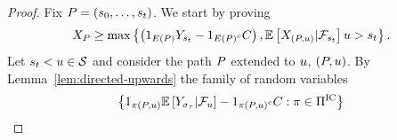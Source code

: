 \begin{proof}
    Fix
    \(
        P
        =
        \left(
            s_{0},
            \ldots,
            s_{t}
        \right)
    \).
    We start by proving
    \begin{align*}
        X_{P}
        \geq
        \max\left\{
            \left(
                1_{
                    E\left(P\right)
                }
                Y_{s_{t}}
                -
                1_{
                    E\left(P\right)^c
                }
                C
            \right),
            \mathbb{E}\left[
                X_{
                    \left(
                        P, u
                    \right)
                }
                |
                \mathcal{F}_{s_{t}}
            \right]
            u
            > s_{t} 
        \right\} .
    \end{align*}  
    Let 
    \(
        s_{t}<u\in\mathcal{S}
    \)
    and consider the path $P$ extended to $u$, 
    \(
        \left(
            P,u
        \right)
    \).
    By Lemma~\ref{lem:directed-upwards} the family of random variables
    \begin{align*}
        \left\{
            1_{
                \pi\left(
                    P,u
                \right)
            }
            \mathbb{E}\left[
                Y_{
                    \sigma_{\tau}
                }
                |
                \mathcal{F}_{u}
            \right]
            -
            1_{
                \pi\left(
                    P,u
                \right)^c
            }
            C 
            :
            \pi\in\Pi^{\text{IC}}
        \right\}
    \end{align*}  

\end{proof}
